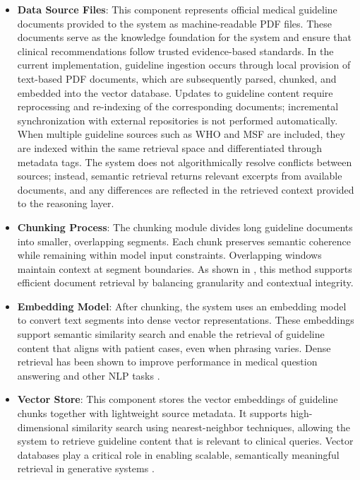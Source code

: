 \documentclass[preprint,12pt]{elsarticle}
\begin{document}
\begin{itemize}

\item \textbf{Data Source Files}: This component represents official medical guideline documents provided to the system as machine-readable PDF files. These documents serve as the knowledge foundation for the system and ensure that clinical recommendations follow trusted evidence-based standards. 
In the current implementation, guideline ingestion occurs through local provision of text-based PDF documents, which are subsequently parsed, chunked, and embedded into the vector database. Updates to guideline content require reprocessing and re-indexing of the corresponding documents; incremental synchronization with external repositories is not performed automatically. When multiple guideline sources such as WHO and MSF are included, they are indexed within the same retrieval space and differentiated through metadata tags. The system does not algorithmically resolve conflicts between sources; instead, semantic retrieval returns relevant excerpts from available documents, and any differences are reflected in the retrieved context provided to the reasoning layer.


\item \textbf{Chunking Process}: The chunking module divides long guideline documents into smaller, overlapping segments. Each chunk preserves semantic coherence while remaining within model input constraints. Overlapping windows maintain context at segment boundaries. As shown in \cite{r5}, this method supports efficient document retrieval by balancing granularity and contextual integrity.

\item \textbf{Embedding Model}: After chunking, the system uses an embedding model to convert text segments into dense vector representations. These embeddings support semantic similarity search and enable the retrieval of guideline content that aligns with patient cases, even when phrasing varies. Dense retrieval has been shown to improve performance in medical question answering and other NLP tasks \cite{r6}.

\item \textbf{Vector Store}: This component stores the vector embeddings of guideline chunks together with lightweight source metadata. It supports high-dimensional similarity search using nearest-neighbor techniques, allowing the system to retrieve guideline content that is relevant to clinical queries. Vector databases play a critical role in enabling scalable, semantically meaningful retrieval in generative systems \cite{r7}.


\end{itemize}
\end{document}
